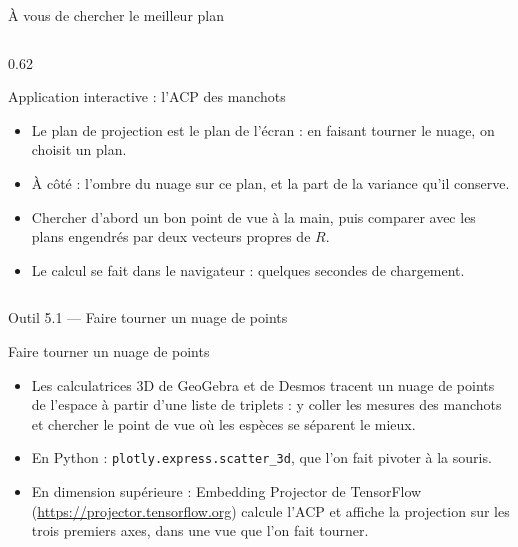 \begin{frame}{À vous de chercher le meilleur plan}
  \begin{columns}[c]
    \begin{column}{0.62\textwidth}
      \begin{Outil}{Application interactive : l'ACP des manchots}
        \small
        \begin{itemize}
          \item Le plan de projection est le plan de l'écran : en faisant
            tourner le nuage, on choisit un plan.
          \item À côté : l'ombre du nuage sur ce plan, et la part de la
            variance qu'il conserve.
          \item Chercher d'abord un bon point de vue à la main, puis comparer
            avec les plans engendrés par deux vecteurs propres de $R$.
          \item Le calcul se fait dans le navigateur : quelques secondes de
            chargement.
        \end{itemize}
      \end{Outil}
    \end{column}
  \end{columns}
\end{frame}

\begin{frame}{Outil 5.1 --- Faire tourner un nuage de points}
  \begin{Outil}{Faire tourner un nuage de points}
    \begin{itemize}
      \item Les calculatrices 3D de GeoGebra et de Desmos tracent un nuage
        de points de l'espace à partir d'une liste de triplets : y coller
        les mesures des manchots et chercher le point de vue où les espèces
        se séparent le mieux.
      \item En Python : \texttt{plotly.express.scatter\_3d}, que l'on fait
        pivoter à la souris.
      \item En dimension supérieure : Embedding Projector de TensorFlow
        (\url{https://projector.tensorflow.org}) calcule l'ACP et affiche la
        projection sur les trois premiers axes, dans une vue que l'on fait
        tourner.
    \end{itemize}
  \end{Outil}
\end{frame}
